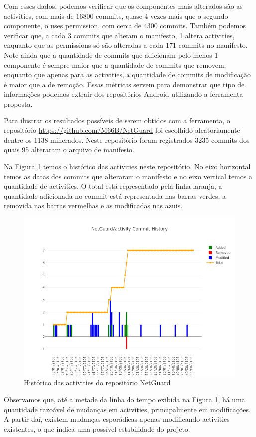\documentclass[a4paper,12pt]{article}
\begin{document}
{Com esses dados, podemos verificar que os componentes mais alterados são as activities, com mais de 16800 commits, quase 4 vezes mais que o segundo componente, o uses permission, com cerca de 4300 commits. Também podemos verificar que, a cada 3 commits que alteram o manifesto, 1 altera activities, enquanto que as permissions só são alteradas a cada 171 commits no manifesto. Note ainda que a quantidade de commits que adicionam pelo menos 1 componente é sempre maior que a quantidade de commits que removem, enquanto que apenas para as activities, a quantidade de commits de modificação é maior que a de remoção. Essas métricas servem para demonstrar que tipo de informações podemos extrair dos repositórios Android utilizando a ferramenta proposta. 

\sloppy
Para ilustrar os resultados possíveis de serem obtidos com a ferramenta, o repositório {\fontsize{10pt}{12pt}\url{https://github.com/M66B/NetGuard}} foi escolhido aleatoriamente dentre os 1138 minerados. Neste repositório foram registrados 3235 commits dos quais 95 alteraram o arquivo de manifesto.

Na Figura \ref{fig:repoactivity} temos o histórico das activities neste repositório. No eixo horizontal temos as datas dos commits que alteraram o manifesto e no eixo vertical temos a quantidade de activities. O total está representado pela linha laranja, a quantidade adicionada no commit está representada nas barras verdes, a removida nas barras vermelhas e as modificadas nas azuis. 

\begin{figure}[H]
\centering
\includegraphics[width=\linewidth,height=0.5\linewidth]{imgs/NetGuard_activity_history.png}
\caption{Histórico das activities do repositório NetGuard}
\label{fig:repoactivity}
\end{figure}

Observamos que, até a metade da linha do tempo exibida na Figura \ref{fig:repoactivity}, há uma quantidade razoável de mudanças em activities, principalmente em modificações. A partir daí, existem mudanças esporádicas apenas modificando activities existentes, o que indica uma possível estabilidade do projeto.

}
\end{document}
